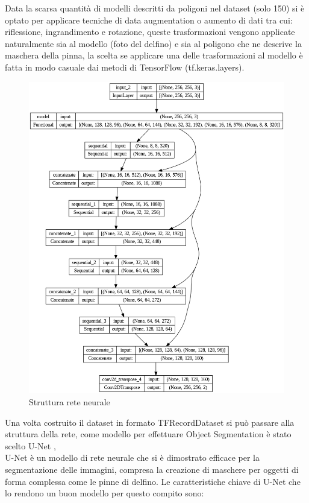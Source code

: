 \documentclass[a4paper,12pt]{report}
\begin{document}
      Data la scarsa quantità di modelli descritti da poligoni nel dataset (solo 150)
      si è optato per applicare tecniche di data augmentation o aumento di dati tra cui: riflessione, ingrandimento e rotazione,
      queste trasformazioni vengono applicate naturalmente sia al modello (foto del delfino) 
      e sia al poligono che ne descrive la maschera 
      della pinna, la scelta se applicare una delle trasformazioni al modello è fatta in modo 
      casuale dai metodi di TensorFlow (tf.keras.layers).
    
      \begin{figure}[H]
        \centering
        \begin{minipage}{0.8\textwidth}
          \centering
          \includegraphics[width=\textwidth]{assets/images/methods/deep/network/network.png}   
          \caption{Struttura rete neurale}
        \end{minipage}
      \end{figure}
      Una volta costruito il dataset in formato TFRecordDataset si può passare
      alla struttura della rete, come modello per effettuare Object Segmentation
      è stato scelto U-Net \cite{ronneberger2015u},
      \\ 
      U-Net è un modello di rete neurale che si è dimostrato efficace per la segmentazione delle immagini,
      compresa la creazione di maschere per oggetti di forma complessa come le pinne di delfino.
      Le caratteristiche chiave di U-Net che lo rendono un buon modello per questo compito sono:
\end{document}
